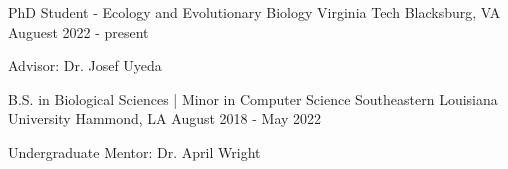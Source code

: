 

\begin{cventries}

  \cventry
    {PhD Student - Ecology and Evolutionary Biology} %
    {Virginia Tech} %
    {Blacksburg, VA} %
    {Auguest 2022 - present} %
    {
      \begin{cvitems} %
        \item {Advisor: Dr. Josef Uyeda}
      \end{cvitems}
    }

  \cventry
    {B.S. in Biological Sciences | Minor in Computer Science} %
    {Southeastern Louisiana University} %
    {Hammond, LA} %
    {August 2018 - May 2022} %
    {
      \begin{cvitems} %
        \item {Undergraduate Mentor: Dr. April Wright}
      \end{cvitems}
    }

\end{cventries}
